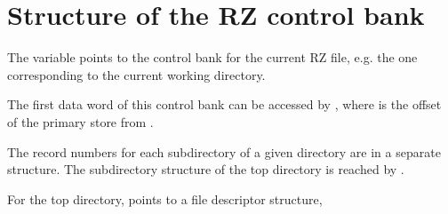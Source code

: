 \section{Structure of the RZ control bank}

The variable  points to the control bank
for the current RZ file, e.g. the one corresponding
to the current working directory. 
% 
% 
% 

The first data word of this control bank can be accessed by
, where 
 is the offset of the primary store from .

The record numbers for each subdirectory of a given
directory are in a separate structure. The subdirectory
structure of the top directory is reached by .

For the top directory, 
points to a file descriptor structure,

